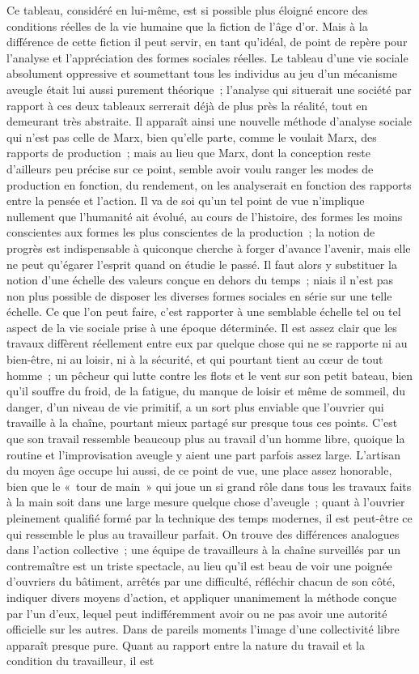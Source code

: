 \documentclass[french,twoside]{book} %
\begin{document}
Ce tableau, considéré en lui-même, est si possible plus éloigné encore des conditions réelles de la vie humaine que la fiction de l'âge d'or. Mais à la différence de cette fiction il peut servir, en tant qu'idéal, de point de repère pour l'analyse et l'appréciation des formes sociales réelles. Le tableau d'une vie sociale absolument oppressive et soumettant tous les individus au jeu d'un mécanisme aveugle était lui aussi purement théorique ; l'analyse qui situerait une société par rapport à ces deux tableaux serrerait déjà de plus près la réalité, tout en demeurant très abstraite. Il apparaît ainsi une nouvelle méthode d'analyse sociale qui n'est pas celle de Marx, bien qu'elle parte, comme le voulait Marx, des rapports de production ; mais au lieu que Marx, dont la conception reste d'ailleurs peu précise sur ce point, semble avoir voulu ranger les modes de production en fonction, du rendement, on les analyserait en fonction des rapports entre la pensée et l'action. Il va de soi qu'un tel point de vue n'implique nullement que l'humanité ait évolué, au cours de l'histoire, des formes les moins conscientes aux formes les plus conscientes de la production ; la notion de progrès est indispensable à quiconque cherche à forger d'avance l'avenir, mais elle ne peut qu'égarer l'esprit quand on étudie le passé. Il faut alors y substituer la notion d'une échelle des valeurs conçue en dehors du temps ; niais il n'est pas non plus possible de disposer les diverses formes sociales en série sur une telle échelle. Ce que l'on peut faire, c'est rapporter à une semblable échelle tel ou tel aspect de la vie sociale prise à une époque déterminée. Il est assez clair que les travaux diffèrent réellement entre eux par quelque chose qui ne se rapporte ni au bien-être, ni au loisir, ni à la sécurité, et qui pourtant tient au cœur de tout homme ; un pêcheur qui lutte contre les flots et le vent sur son petit bateau, bien qu'il souffre du froid, de la fatigue, du manque de loisir et même de sommeil, du danger, d'un niveau de vie primitif, a un sort plus enviable que l'ouvrier qui travaille à la chaîne, pourtant mieux partagé sur presque tous ces points. C'est que son travail ressemble beaucoup plus au travail d'un homme libre, quoique la routine et l'improvisation aveugle y aient une part parfois assez large. L'artisan du moyen âge occupe lui aussi, de ce point de vue, une place assez honorable, bien que le « tour de main » qui joue un si grand rôle dans tous les travaux faits à la main soit dans une large mesure quelque chose d'aveugle ; quant à l'ouvrier pleinement qualifié formé par la technique des temps modernes, il est peut-être ce qui ressemble le plus au travailleur parfait. On trouve des différences analogues dans l'action collective ; une équipe de travailleurs à la chaîne surveillés par un contremaître est un triste spectacle, au lieu qu'il est beau de voir une poignée d'ouvriers du bâtiment, arrêtés par une difficulté, réfléchir chacun de son côté, indiquer divers moyens d'action, et appliquer unanimement la méthode conçue par l'un d'eux, lequel peut indifféremment avoir ou ne pas avoir une autorité officielle sur les autres. Dans de pareils moments l'image d'une collectivité libre apparaît presque pure. Quant au rapport entre la nature du travail et la condition du travailleur, il est 
\end{document}
